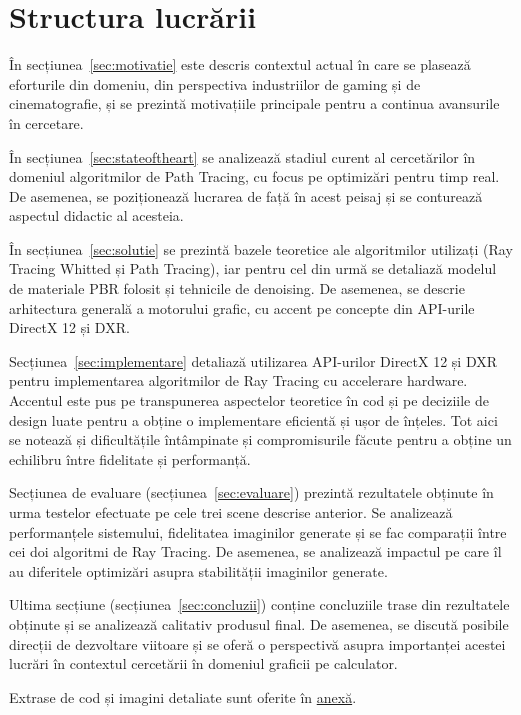 \documentclass[12pt,a4paper]{report}
\numberwithin{equation}{section} %
\begin{document}
\section{Structura lucrării}

În secțiunea~\ref{sec:motivatie} este descris contextul actual în care se plasează
eforturile din domeniu, din perspectiva industriilor de gaming și de cinematografie,
și se prezintă motivațiile principale pentru a continua avansurile în cercetare.

În secțiunea~\ref{sec:stateoftheart} se analizează stadiul curent al cercetărilor
în domeniul algoritmilor de Path Tracing, cu focus pe optimizări pentru timp real.
De asemenea, se poziționează lucrarea de față în acest peisaj și se conturează
aspectul didactic al acesteia.

În secțiunea~\ref{sec:solutie} se prezintă bazele teoretice ale algoritmilor
utilizați (Ray Tracing Whitted și Path Tracing), iar pentru cel din urmă se
detaliază modelul de materiale PBR folosit și tehnicile de denoising. De asemenea, se descrie arhitectura
generală a motorului grafic, cu accent pe concepte din API-urile DirectX 12 și
DXR.

Secțiunea~\ref{sec:implementare} detaliază utilizarea API-urilor DirectX 12 și DXR
pentru implementarea algoritmilor de Ray Tracing cu accelerare hardware. Accentul
este pus pe transpunerea aspectelor teoretice în cod și pe deciziile de design luate pentru a obține o implementare
eficientă și ușor de înțeles. Tot aici se notează și dificultățile întâmpinate
și compromisurile făcute pentru a obține un echilibru între fidelitate și performanță.

Secțiunea de evaluare (secțiunea~\ref{sec:evaluare}) prezintă rezultatele obținute
în urma testelor efectuate pe cele trei scene descrise anterior. Se analizează
performanțele sistemului, fidelitatea imaginilor generate și se fac comparații
între cei doi algoritmi de Ray Tracing. De asemenea, se analizează impactul pe
care îl au diferitele optimizări asupra stabilității imaginilor generate.

Ultima secțiune (secțiunea~\ref{sec:concluzii}) conține concluziile trase din
rezultatele obținute și se analizează calitativ produsul final. De asemenea, se
discută posibile direcții de dezvoltare viitoare și se oferă o perspectivă asupra
importanței acestei lucrări în contextul cercetării în domeniul graficii pe calculator.

Extrase de cod și imagini detaliate sunt oferite în \hyperref[anexa]{anexă}.
\end{document}
